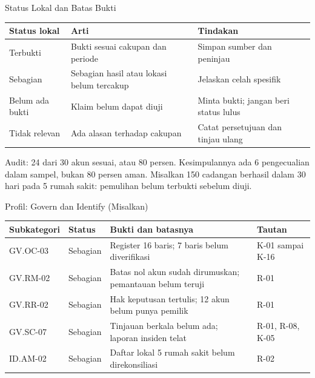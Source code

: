 \documentclass[aspectratio=169, table, 12pt]{beamer}
\begin{document}
\begin{frame}{{\Large Status Lokal dan Batas Bukti}}
  \vspace{2pt}
  \scriptsize
  \begin{tabularx}{\textwidth}{|>{\raggedright\arraybackslash}p{}|>{\raggedright\arraybackslash}X|>{\raggedright\arraybackslash}X|}
    \hline
    \textbf{Status lokal} & \textbf{Arti} & \textbf{Tindakan} \\ \hline
    Terbukti & Bukti sesuai cakupan dan periode & Simpan sumber dan peninjau \\ \hline
    Sebagian & Sebagian hasil atau lokasi belum tercakup & Jelaskan celah spesifik \\ \hline
    Belum ada bukti & Klaim belum dapat diuji & Minta bukti; jangan beri status lulus \\ \hline
    Tidak relevan & Ada alasan terhadap cakupan & Catat persetujuan dan tinjau ulang \\ \hline
  \end{tabularx}

  \vspace{6pt}
  \small Audit: 24 dari 30 akun sesuai, atau 80 persen. Kesimpulannya ada 6 pengecualian dalam
  sampel, bukan 80 persen aman. Misalkan 150 cadangan berhasil dalam 30 hari pada 5 rumah sakit:
  pemulihan belum terbukti sebelum diuji.
\end{frame}

\begin{frame}{{\Large Profil: Govern dan Identify (Misalkan)}}
  \vspace{2pt}
  \footnotesize
  \begin{tabularx}{\textwidth}{|>{\raggedright\arraybackslash}p{}|>{\raggedright\arraybackslash}p{}|>{\raggedright\arraybackslash}X|>{\raggedright\arraybackslash}p{}|}
    \hline
    \textbf{Subkategori} & \textbf{Status} & \textbf{Bukti dan batasnya} & \textbf{Tautan} \\ \hline
    GV.OC-03 & Sebagian & Register 16 baris; 7 baris belum diverifikasi & K-01 sampai K-16 \\ \hline
    GV.RM-02 & Sebagian & Batas nol akun sudah dirumuskan; pemantauan belum teruji & R-01 \\ \hline
    GV.RR-02 & Sebagian & Hak keputusan tertulis; 12 akun belum punya pemilik & R-01 \\ \hline
    GV.SC-07 & Sebagian & Tinjauan berkala belum ada; laporan insiden telat & R-01, R-08, K-05 \\
    \hline
    ID.AM-02 & Sebagian & Daftar lokal 5 rumah sakit belum direkonsiliasi & R-02 \\ \hline
  \end{tabularx}
\end{frame}
\end{document}
